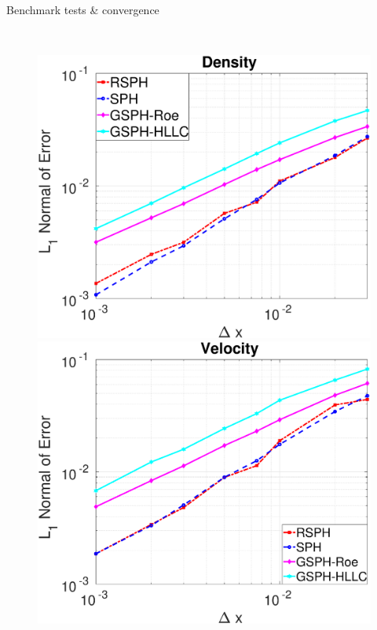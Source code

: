 \documentclass{beamer}
\begin{document}
\begin{frame}{Benchmark tests \& convergence}
{\begin{minipage}{.3\textwidth}
    \end{minipage}}
    \\
\begin{figure}
    \centering
    \begin{minipage}{.3\textwidth}
        \centering
        \includegraphics[width=0.95 \textwidth]{./Chapter-4/Figures/Accuracy-des}
    \end{minipage}%
    \begin{minipage}{.3 \textwidth}
        \centering
        \includegraphics[width=0.95 \textwidth]{./Chapter-4/Figures/Accuracy-vel}
    \end{minipage}%

\end{figure}
\end{frame}
\end{document}
